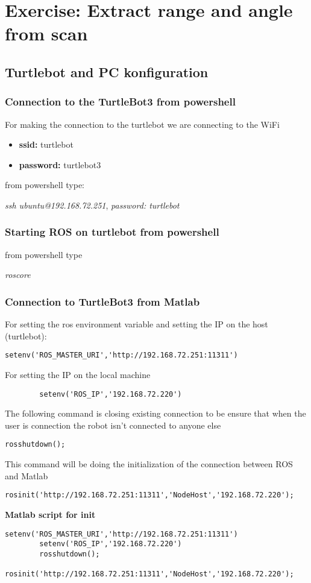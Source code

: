 \documentclass[12pt,a4paper]{article}
\begin{document}
	
	\clearpage
	\section{Exercise: Extract range and angle from scan}
	\subsection*{Turtlebot and PC konfiguration}
	\subsubsection{Connection to the TurtleBot3 from powershell}
	For making the connection to the turtlebot we are connecting to the WiFi 
	\begin{itemize}
		\item \textbf{ssid:} turtlebot
		\item \textbf{password:} turtlebot3
	\end{itemize}
	from powershell type:
	\begin{center}
		\textit{ssh ubuntu@192.168.72.251}, \textit{password: turtlebot}
	\end{center}
	\subsubsection{Starting ROS on turtlebot from powershell}
	from powershell type
	\begin{center}
		\textit{roscore}
	\end{center}
	\subsubsection{Connection to TurtleBot3 from Matlab}
	For setting the ros environment variable and setting the IP on the host (turtlebot):
	\begin{lstlisting}[style=Matlab-editor]
		setenv('ROS_MASTER_URI','http://192.168.72.251:11311')\end{lstlisting}
	For setting the IP on the local machine 
	\begin{lstlisting}
		setenv('ROS_IP','192.168.72.220')\end{lstlisting}
	The following command is closing existing connection to be ensure that when the user is connection the robot isn't connected to anyone else
	\begin{lstlisting}[style=Matlab-editor]
		rosshutdown();\end{lstlisting}
	This command will be doing the initialization of the connection between ROS and Matlab
	\begin{lstlisting}[style=Matlab-editor]
		rosinit('http://192.168.72.251:11311','NodeHost','192.168.72.220');\end{lstlisting} 
	\vspace{1cm}
	\noindent\textbf{Matlab script for init}
	\begin{lstlisting}[style=Matlab-editor]
		setenv('ROS_MASTER_URI','http://192.168.72.251:11311')
		setenv('ROS_IP','192.168.72.220')
		rosshutdown();
		rosinit('http://192.168.72.251:11311','NodeHost','192.168.72.220');\end{lstlisting}
	\clearpage
\end{document}
